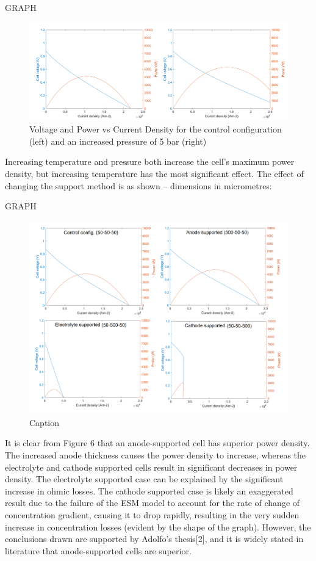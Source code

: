       GRAPH
      \begin{figure}[h!]
        \centering
        \includegraphics[width=1\textwidth]{controlvsinc_pres.png}
        \caption{Voltage and Power vs Current Density for the control configuration (left) and an increased pressure of 5 bar (right)}
        \label{fig:SOFCpresinc}
    \end{figure}
    
    Increasing temperature and pressure both increase the cell’s maximum power density, but increasing temperature has the most significant effect.
    The effect of changing the support method is as shown – dimensions in micrometres:

  GRAPH
  \begin{figure}[h!]
      \centering
      \includegraphics[scale=0.6]{support_comparison.png}
      \caption{Caption}
      \label{fig:SOFCsupport}
  \end{figure}
  
    It is clear from Figure 6 that an anode-supported cell has superior power density. The increased anode thickness causes the power density to increase, whereas the electrolyte and cathode supported cells result in significant decreases in power density. The electrolyte supported case can be explained by the significant increase in ohmic losses. The cathode supported case is likely an exaggerated result due to the failure of the ESM model to account for the rate of change of concentration gradient, causing it to drop rapidly, resulting in the very sudden increase in concentration losses (evident by the shape of the graph). However, the conclusions drawn are supported by Adolfo’s thesis[2], and it is widely stated in literature that anode-supported cells are superior. 
    \
   \
   \
   \
   \
